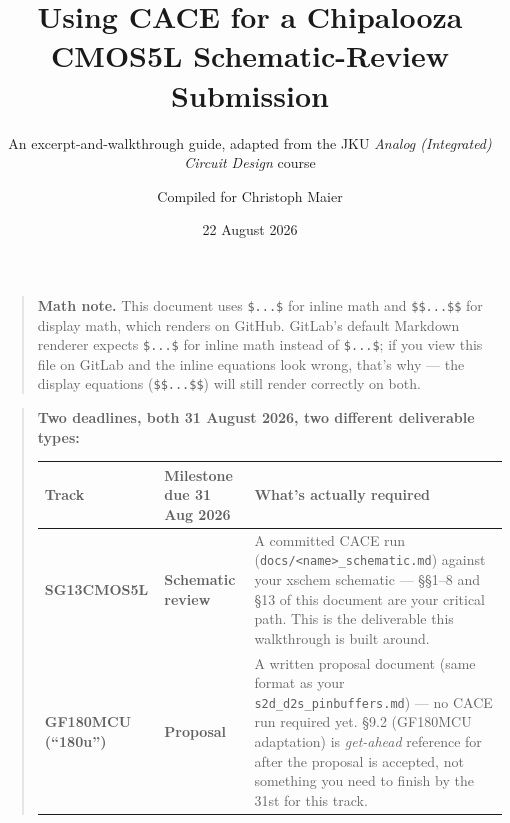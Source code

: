 \documentclass[
]{article}
\title{Using CACE for a Chipalooza CMOS5L Schematic-Review Submission}
\subtitle{An excerpt-and-walkthrough guide, adapted from the JKU
\emph{Analog (Integrated) Circuit Design} course}
\author{Compiled for Christoph Maier}
\date{22 August 2026}
\begin{document}
\maketitle

{
\setcounter{tocdepth}{3}
\tableofcontents
}
\begin{quote}
\textbf{Math note.} This document uses \texttt{\$...\$} for inline math
and \texttt{\$\$...\$\$} for display math, which renders on GitHub.
GitLab's default Markdown renderer expects
\texttt{\$\textasciigrave{}...\textasciigrave{}\$} for inline math
instead of \texttt{\$...\$}; if you view this file on GitLab and the
inline equations look wrong, that's why --- the display equations
(\texttt{\$\$...\$\$}) will still render correctly on both.
\end{quote}

\begin{quote}
\textbf{Two deadlines, both 31 August 2026, two different deliverable
types:}

\begin{longtable}[]{@{}lll@{}}
\toprule
\begin{minipage}[b]{0.30\columnwidth}\raggedright
Track\strut
\end{minipage} & \begin{minipage}[b]{0.30\columnwidth}\raggedright
Milestone due 31 Aug 2026\strut
\end{minipage} & \begin{minipage}[b]{0.30\columnwidth}\raggedright
What's actually required\strut
\end{minipage}\tabularnewline
\midrule
\endhead
\begin{minipage}[t]{0.30\columnwidth}\raggedright
\textbf{SG13CMOS5L}\strut
\end{minipage} & \begin{minipage}[t]{0.30\columnwidth}\raggedright
\textbf{Schematic review}\strut
\end{minipage} & \begin{minipage}[t]{0.30\columnwidth}\raggedright
A committed CACE run
(\texttt{docs/\textless{}name\textgreater{}\_schematic.md}) against your
xschem schematic --- §§1--8 and §13 of this document are your critical
path. This is the deliverable this walkthrough is built around.\strut
\end{minipage}\tabularnewline
\begin{minipage}[t]{0.30\columnwidth}\raggedright
\textbf{GF180MCU (``180u'')}\strut
\end{minipage} & \begin{minipage}[t]{0.30\columnwidth}\raggedright
\textbf{Proposal}\strut
\end{minipage} & \begin{minipage}[t]{0.30\columnwidth}\raggedright
A written proposal document (same format as your
\texttt{s2d\_d2s\_pinbuffers.md}) --- no CACE run required yet. §9.2
(GF180MCU adaptation) is \emph{get-ahead} reference for after the
proposal is accepted, not something you need to finish by the 31st for
this track.\strut
\end{minipage}\tabularnewline
\bottomrule
\end{longtable}


\end{quote}
\end{document}
